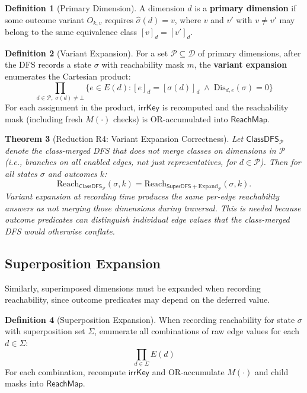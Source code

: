 \documentclass[11pt]{article}
\newtheorem{theorem}{Theorem}[section]
\theoremstyle{definition}
\newtheorem{definition}[theorem]{Definition}
\newcommand{\Dim}{\mathcal{D}}         %
\newcommand{\Edg}[1]{E(#1)}            %
\newcommand{\sel}{\sigma}              %
\newcommand{\ik}{\mathsf{irrKey}}      %
\newcommand{\Reach}{\mathrm{Reach}}    %
\newcommand{\Dis}{\mathrm{Dis}}        %
\begin{document}
\begin{definition}[Primary Dimension]\label{def:primary}
A dimension $d$ is a \textbf{primary dimension} if some outcome variant
$O_{k,v}$ requires $\hat\sel(d) = v$, where $v$ and $v'$ with $v \neq v'$
may belong to the same equivalence class $[v]_d = [v']_d$.
\end{definition}

\begin{definition}[Variant Expansion]\label{def:expand}
For a set $\mathcal{P} \subseteq \Dim$ of primary dimensions, after the
DFS records a state $\sel$ with reachability mask $m$, the
\textbf{variant expansion} enumerates the Cartesian product:
\[
  \prod_{d \in \mathcal{P},\;\sel(d)\neq\bot}
  \{e \in \Edg{d} : [e]_d = [\sel(d)]_d
   \;\wedge\; \Dis_{d,e}(\sel)=0\}
\]
For each assignment in the product, $\ik$ is recomputed and the
reachability mask (including fresh $M(\cdot)$ checks) is OR-accumulated
into $\mathsf{ReachMap}$.
\end{definition}

\begin{theorem}[Reduction R4: Variant Expansion Correctness]\label{thm:variant}
Let $\textsf{ClassDFS}_\mathcal{P}$ denote the class-merged DFS that does
\emph{not} merge classes on dimensions in $\mathcal{P}$ (i.e., branches
on all enabled edges, not just representatives, for $d \in \mathcal{P}$).
Then for all states $\sel$ and outcomes $k$:
\[
  \Reach_{\textsf{ClassDFS}_\mathcal{P}}(\sel,k)
  = \Reach_{\textsf{SuperDFS}+\text{Expand}_\mathcal{P}}(\sel,k).
\]
Variant expansion at recording time produces the same per-edge
reachability answers as not merging those dimensions during traversal.
This is needed because outcome predicates can distinguish individual edge
values that the class-merged DFS would otherwise conflate.
\end{theorem}

\subsection{Superposition Expansion}\label{sec:superexpand}

Similarly, superimposed dimensions must be expanded when recording
reachability, since outcome predicates may depend on the deferred value.

\begin{definition}[Superposition Expansion]\label{def:superexpand}
When recording reachability for state $\sel$ with superposition set
$\Sigma$, enumerate all combinations of raw edge values for each
$d \in \Sigma$:
\[
  \prod_{d \in \Sigma} \Edg{d}
\]
For each combination, recompute $\ik$ and OR-accumulate
$M(\cdot)$ and child masks into $\mathsf{ReachMap}$.
\end{definition}
\end{document}

